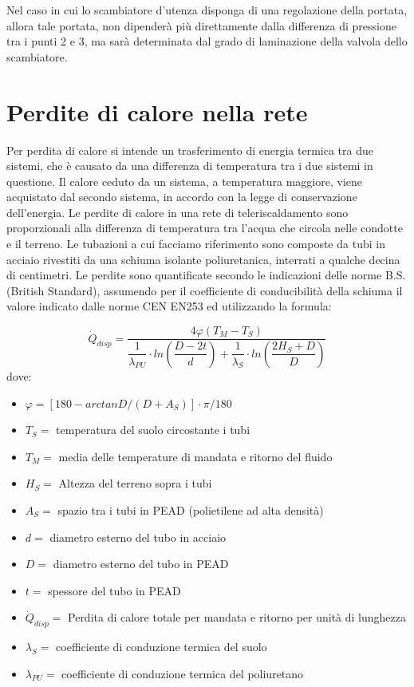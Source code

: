 \documentclass[laurea,oneside,11pt]{USiena_tesiLM}
\begin{document}
Nel caso in cui lo scambiatore d'utenza disponga di una regolazione della portata, allora tale portata, non dipenderà più direttamente dalla differenza di pressione tra i punti 2 e 3, ma sarà determinata dal grado di laminazione della valvola dello scambiatore. 

\section{Perdite di calore nella rete}
Per perdita di calore si intende un trasferimento di 
energia termica tra due sistemi, che è causato da una differenza di temperatura tra i due sistemi in questione. Il calore ceduto da un sistema, a temperatura maggiore, viene acquistato dal secondo sistema, in accordo con la legge di conservazione dell'energia. 
Le perdite di calore in una rete di teleriscaldamento sono proporzionali alla differenza di temperatura tra l'acqua che circola nelle condotte e il terreno. Le tubazioni a cui facciamo riferimento sono composte da tubi in acciaio rivestiti da una schiuma isolante poliuretanica, interrati a qualche decina di centimetri.
Le perdite sono quantificate secondo le indicazioni delle norme B.S. (British Standard), assumendo per il coefficiente di conducibilità della schiuma il valore indicato dalle norme CEN EN253 ed utilizzando la formula:

\begin{equation}
\dot{Q}_{disp} = \dfrac{4 \varphi (T_M - T_S)}{\dfrac{1}{\lambda_{PU}} \cdot ln \left(  \dfrac{D - 2t}{d}\right)  + \dfrac{1}{\lambda_S} \cdot ln \left(  \dfrac{2H_S + D}{D}\right) }
\end{equation}
dove:
\begin{itemize}
\item $\varphi = \left[ 180 - arctan  D /( D + A_S)  \right] \cdot \pi/180 $  
\item $T_S =$ temperatura del suolo circostante i tubi
\item $T_M =$ media delle temperature di mandata e ritorno del fluido
\item $H_S =$ Altezza del terreno sopra i tubi
\item $A_S =$ spazio tra i tubi in PEAD (polietilene ad alta densità)
\item $d =$ diametro esterno del tubo in acciaio
\item $D =$ diametro esterno del tubo in PEAD
\item $t =$ spessore del tubo in PEAD
\item $\dot{Q}_{disp} =$ Perdita di calore totale per mandata e ritorno per unità di lunghezza
\item $\lambda_S =$ coefficiente di conduzione termica del suolo
\item $\lambda_{PU} =$ coefficiente di conduzione termica del poliuretano
\end{itemize}
\end{document}
